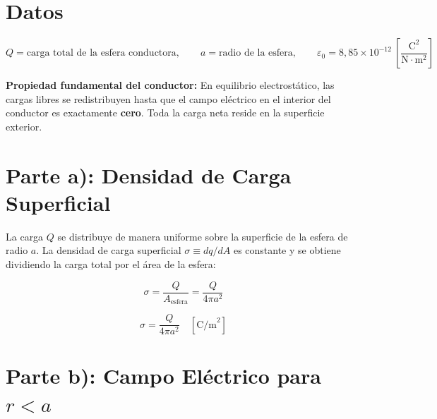 \documentclass[12pt,letterpaper]{article}
\begin{document}
\section*{Datos}

\[
    Q = \text{carga total de la esfera conductora},
    \qquad
    a = \text{radio de la esfera},
    \qquad
    \varepsilon_0 = 8{,}85 \times 10^{-12}
    \ \left[\frac{\text{C}^2}{\text{N}\cdot\text{m}^2}\right]
\]

\textbf{Propiedad fundamental del conductor:} En equilibrio electrost\'atico, las
cargas libres se redistribuyen hasta que el campo el\'ectrico en el interior del
conductor es exactamente \textbf{cero}. Toda la carga neta reside en la
superficie exterior.

\section*{Parte a): Densidad de Carga Superficial}

La carga $Q$ se distribuye de manera uniforme sobre la superficie de la esfera
de radio $a$. La densidad de carga superficial $\sigma \equiv dq/dA$ es constante
y se obtiene dividiendo la carga total por el \'area de la esfera:

\[
    \sigma = \frac{Q}{A_\text{esfera}} = \frac{Q}{4\pi a^2}
\]

\[
    \boxed{\sigma = \frac{Q}{4\pi a^2} \quad \left[\text{C/m}^2\right]}
\]

\bigskip

\section*{Parte b): Campo El\'ectrico para $r < a$}
\end{document}
